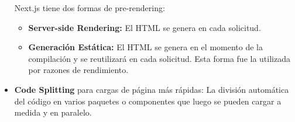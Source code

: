 \documentclass[12pt,twoside,titlepage]{report}
\begin{document}
\begin{itemize}
    Next.js tiene dos formas de pre-rendering:
    \begin{itemize}
        \item \textbf{Server-side Rendering:} El HTML se genera en cada solicitud. %
        \item \textbf{Generación Estática:} El HTML se genera en el momento de la compilación y se reutilizará en cada solicitud. Esta forma fue la utilizada por razones de rendimiento. %
    \end{itemize}

    \item \textbf{Code Splitting} para cargas de página más rápidas: La división automática del código en varios paquetes o componentes que luego se pueden cargar a medida y en paralelo. 
    

\end{itemize}
\end{document}
